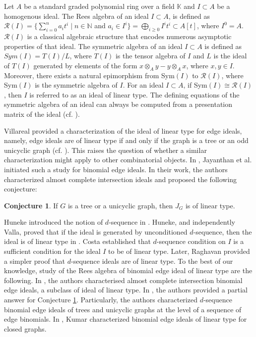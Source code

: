 \documentclass[11pt,a4paper,reqno]{amsart}
\theoremstyle{definition}
\newtheorem{alphconj}{Conjecture}
\begin{document}
\vspace{2mm}
 
 Let $A$ be a standard graded polynomial ring over a field $\mathbb{K}$ and $I \subset A$ be a homogenous ideal. The Rees algebra of an ideal $I \subset A$, is defined as $\mathcal{R}(I)= \{ \sum_{i=0}^n a_it^i \mid n \in \mathbb{N}$  and  $a_i \in I^i \} =\bigoplus_{i \geq 0}I^it^i \subset A[t]$, where $I^0=A$. $\mathcal{R}(I)$ is a classical algebraic structure that encodes numerous asymptotic properties of that ideal. 
 The symmetric algebra of an ideal $I \subset A$ is defined as $Sym(I)= T(I)/L$, where $T(I)$ is the tensor algebra of $I$ and $L$ is the ideal of $T(I)$ generated by elements of the form $x\otimes_A y- y \otimes_A x$, where $x,y \in I$. 
 Moreover, there exists a natural epimorphism from Sym$(I)$ to $\mathcal{R}(I)$, where Sym$(I)$ is the symmetric algebra of $I$. For an ideal $I\subset A$, if Sym$(I) \cong \mathcal{R}(I)$, then $I$ is referred to as an ideal of linear type. The defining equations of the symmetric algebra of an ideal can always be computed from a presentation matrix of the ideal (cf. \cite[Section 5.5]{HS2006}).
 
 
\vspace{2mm}
 
 Villareal provided a characterization of the ideal of linear type for edge ideals, namely, edge ideals are of linear type if and only if the graph is a tree or an odd unicyclic graph (cf. \cite{V1990}). This raises the question of whether a similar characterization might apply to other combinatorial objects. In \cite{JAR2021}, Jayanthan et al. initiated such a study for binomial edge ideals. In their work, the authors characterized almost complete intersection ideals and proposed the following conjecture:

 \begin{alphconj} \cite[Conjecture 4.17. (a)]{JAR2021} \label{conjlineartype}
    If $G$ is a tree or a unicyclic graph, then $J_G$ is of linear type.
\end{alphconj}

Huneke introduced the notion of $d$-sequence in \cite{H1980, H1982}. Huneke, and independently Valla, proved that if the ideal is generated by unconditioned $d$-sequence, then the ideal is of linear type in \cite{H1980, V1980}. Costa \cite{C1985} established that $d$-sequence condition on $I$ is a sufficient condition for the ideal $I$ to be of linear type. Later, Raghavan \cite{R1991} provided a simpler proof that $d$-sequence ideals are of linear type. To the best of our knowledge, study of the Rees algebra of binomial edge ideal of linear type are the following. In \cite{JAR2021}, the authors characterised almost complete intersection binomial edge ideals, a subclass of ideal of linear type. In \cite{AN, ANcycle}, the authors provided a partial answer for Conjecture \ref{conjlineartype}. Particularly, the authors characterized $d$-sequence binomial edge ideals of trees and unicyclic graphs at the level of a sequence of edge binomials. In \cite{A22}, Kumar characterized binomial edge ideals of linear type for closed graphs. 
\end{document}
